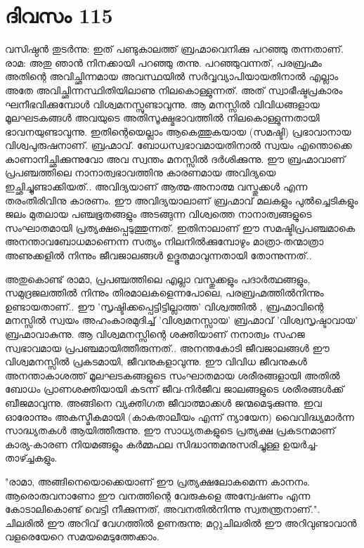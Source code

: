  
\section{ദിവസം 115}


വസിഷ്ഠന്‍ തുടര്‍ന്നു: ഇത്‌ പണ്ടുകാലത്ത്‌ ബ്രഹ്മാവെനിക്കു പറഞ്ഞു തന്നതാണ്‌. രാമ: അതു ഞാന്‍ നിനക്കായി പറഞ്ഞു തന്നു. പറഞ്ഞുവന്നത്,  പരബ്രഹ്മം അതിന്റെ അവിച്ഛിന്നമായ അവസ്ഥയില്‍ സര്‍വ്വവ്യാപിയായതിനാല്‍ എല്ലാം അതേ അവിച്ഛിന്നസ്ഥിതിയിലാണു നിലകൊള്ളുന്നത്‌. അത്‌ സ്വാഭീഷ്ടപ്രകാരം ഘനീഭവിക്കുമ്പോള്‍ വിശ്വമനസ്സുണ്ടാവുന്നു. ആ മനസ്സില്‍ വിവിധങ്ങളായ മൂലഘടകങ്ങള്‍ അവയുടെ അതിസൂക്ഷ്മഭാവത്തില്‍ നിലകൊള്ളുന്നതായി ഭാവനയുണ്ടാവുന്നു. ഇതിന്റെയെല്ലാം ആകെത്തുകയായ (സമഷ്ടി) പ്രഭാവാനായ വിശ്വപുരുഷനാണ്‌. ബ്രഹ്മാവ്‌. ബോധസ്വഭാവമായതിനാല്‍ സ്വയം എന്തൊക്കെ കാണാനിച്ഛിക്കുന്നുവോ അവ സ്വന്തം മനസ്സില്‍ ദര്‍ശിക്കുന്നു. ഈ ബ്രഹ്മാവാണ്‌ പ്രപഞ്ചത്തിലെ നാനാത്വഭാവത്തിനു കാരണമായ അവിദ്യയെ ഇച്ഛിച്ചുണ്ടാക്കിയത്‌.. അവിദ്യയാണ്‌ ആത്മ-അനാത്മ വസ്തുക്കള്‍ എന്ന തരംതിരിവിനു കാരണം. ഈ അവിദ്യയാലാണ്‌ ബ്രഹ്മാവ്‌ മലകളും പുല്‍ച്ചെടികളും ജലം മുതലായ പഞ്ചഭൂതങ്ങളും അടങ്ങുന്ന വിശ്വത്തെ നാനാത്വങ്ങളുടെ സംഘാതമായി പ്രത്യക്ഷപ്പെടുത്തുന്നത്‌. ഇതിനാലാണ്‌ ഈ സമഷ്ടിപ്രപഞ്ചമാകെ അനന്താവബോധമാണെന്ന സത്യം നിലനില്‍ക്കുമ്പോഴും മാത്രാ-തന്മാത്രാ അണുക്കളില്‍ നിന്നും ജീവജാലങ്ങള്‍ ഉദ്ഭൂതമാവുന്നതായി തോന്നുന്നത്‌..

അതുകൊണ്ട്‌ രാമാ, പ്രപഞ്ചത്തിലെ എല്ലാ വസ്തുക്കളും പദാര്‍ത്ഥങ്ങളും, സമുദ്രജലത്തില്‍ നിന്നും തിരമാലകളെന്നപോലെ, പരബ്രഹ്മത്തില്‍നിന്നും ഉണ്ടായതാണ്‌.. ഈ 'സൃഷ്ടിക്കപ്പെട്ടിട്ടില്ലാത്ത' വിശ്വത്തില്‍ , ബ്രഹ്മാവിന്റെ മനസ്സില്‍ സ്വയം അഹംകാരമുദിച്ച്‌ 'വിശ്വമനസ്സായ' ബ്രഹ്മാവ്‌ 'വിശ്വസൃഷ്ടാവായ' ബ്രഹ്മാവാകുന്നു. ആ വിശ്വമനസ്സിന്റെ ശക്തിയാണ്‌ നനാത്വം സഹജ സ്വഭാവമായ പ്രപഞ്ചമായിത്തീരുന്നത്‌.. അനന്തകോടി ജീവജാലങ്ങള്‍ ഈ വിശ്വമനസ്സില്‍ പ്രകടമായി, ജീവനുകളാവുന്നു. ഈ വിവിധ ജീവനുകള്‍ അനന്താകാശത്ത്‌ മൂലഘടകങ്ങളുടെ സംഘാതമായ ശരീരങ്ങളായി അതില്‍ ബോധം പ്രാണശക്തിയായി കടന്ന് ജീവ-നിര്‍ജീവ ജാലങ്ങളുടെ ശരീരങ്ങള്‍ക്ക്‌ ബീജമാവുന്നു. അങ്ങിനെ വ്യക്തിഗത ജീവാത്മാക്കള്‍ ജന്മമെടുക്കുന്നു. ഇവ ഓരോന്നും അകസ്മീകമായി (കാകതാലീയം എന്ന് ന്യായേന) വൈവിദ്ധ്യമാര്‍ന്ന സാദ്ധ്യതകള്‍ ആയിത്തീരുന്നു. ഈ സാധ്യതകളുടെ പ്രത്യക്ഷ പ്രകടനമാണ്‌ കാര്യ-കാരണ നിയമങ്ങളും കര്‍മ്മഫല സിദ്ധാന്തമനുസരിച്ചുള്ള ഉയര്‍ച്ച-താഴ്ച്ചകളും.

"രാമാ, അങ്ങിനെയൊക്കെയാണ്‌ ഈ പ്രത്യക്ഷലോകമെന്ന കാനനം. ആരൊരുവനാണോ ഈ വനത്തിന്റെ വേരുകളെ അന്വേഷണം എന്ന കോടാലികൊണ്ട്‌ വെട്ടി നീക്കുന്നത്‌, അവനതില്‍നിന്നു സ്വതന്ത്രനാണ്‌.". ചിലരില്‍ ഈ അറിവ്‌ വേഗത്തില്‍ ഉണരുന്നു; മറ്റുചിലരില്‍ ഈ അറിവുണ്ടാവാന്‍ വളരെയേറെ സമയമെടുത്തേക്കാം. 
